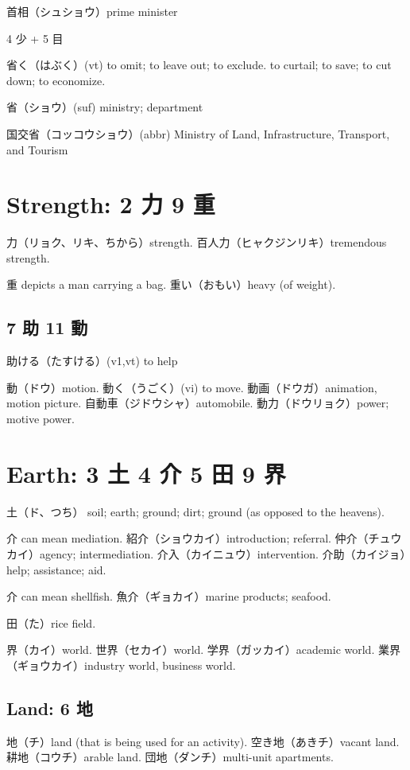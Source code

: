 首相（シュショウ）prime minister

4 少 + 5 目

省く（はぶく）(vt)
to omit; to leave out; to exclude.
to curtail; to save; to cut down; to economize.

省（ショウ）(suf) ministry; department

国交省（コッコウショウ）(abbr)
Ministry of Land, Infrastructure, Transport, and Tourism

\section{Strength: 2 力 9 重}

力（リョク、リキ、ちから）strength.
百人力（ヒャクジンリキ）tremendous strength.

重 depicts a man carrying a bag.
重い（おもい）heavy (of weight).

\subsection{7 助 11 動}

助ける（たすける）(v1,vt) to help

動（ドウ）motion.
動く（うごく）(vi) to move.
動画（ドウガ）animation, motion picture.
自動車（ジドウシャ）automobile.
動力（ドウリョク）power; motive power.

\section{Earth: 3 土 4 介 5 田 9 界}

土（ド、つち）
soil; earth; ground; dirt; ground (as opposed to the heavens).

介 can mean mediation.
紹介（ショウカイ）introduction; referral.
仲介（チュウカイ）agency; intermediation.
介入（カイニュウ）intervention.
介助（カイジョ）help; assistance; aid.

介 can mean shellfish.
魚介（ギョカイ）marine products; seafood.

田（た）rice field.

界（カイ）world.
世界（セカイ）world.
学界（ガッカイ）academic world.
業界（ギョウカイ）industry world, business world.

\subsection{Land: 6 地}

地（チ）land (that is being used for an activity).
空き地（あきチ）vacant land.
耕地（コウチ）arable land.
団地（ダンチ）multi-unit apartments.

